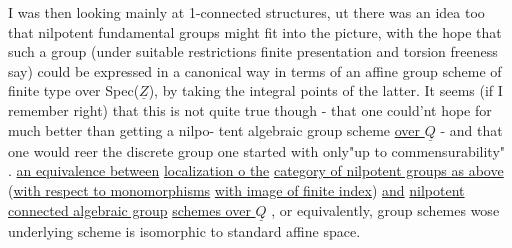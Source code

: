 I was then looking mainly at 1-connected structures,  ut there
was an idea too that nilpotent fundamental groups might fit into the
picture,  with the hope that such a group (under suitable restrictions\hand{,}
 finite presentation and torsion freeness say)  could be 
expressed in a canonical way in terms of an affine  group scheme 
of finite type over Spec($\underline{Z}$),  by taking the integral points of the
latter.  It seems (if I remember right)  that this is not quite true\xout{,}
though  -  that one could'nt hope for much better than getting a nilpo-%
tent algebraic group scheme \uline{over $\underline{Q}$}  -  and that one would reer the
discrete group one started with only\hand{\textbackslash}"up to commensurability" .  
 \uline{an equivalence between}  \uline{localization o the}
\uline{category of nilpotent groups as above} (\uline{with respect to monomorphisms}
\uline{with image of finite index})  \uline{and}  \uline{nilpotent connected algebraic group}
\uline{schemes over $\underline{Q}$} ,  or equivalently,  group schemes wose underlying
scheme is isomorphic to standard affine space.


